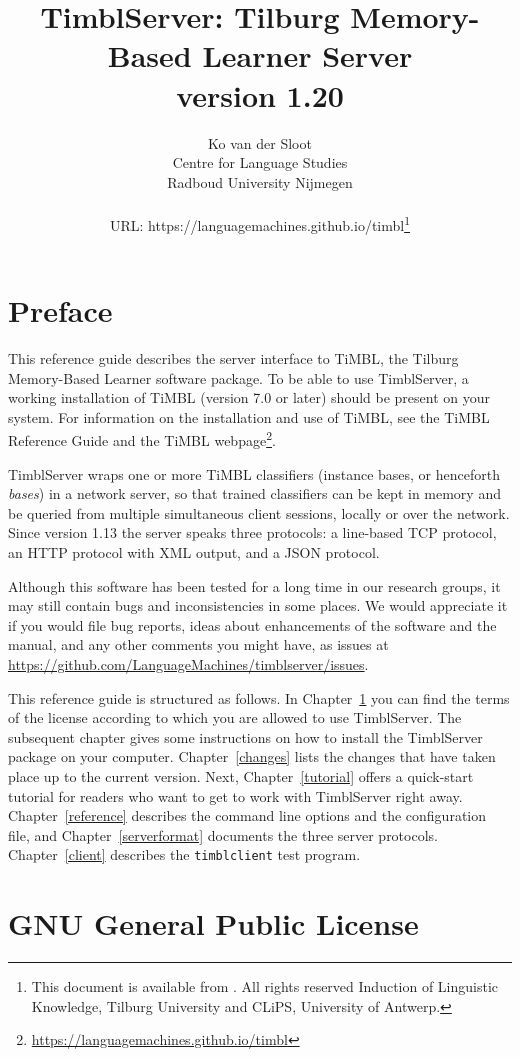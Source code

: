\documentclass{report}
\author{Ko van der Sloot \\
	Centre for Language Studies \\
        Radboud University Nijmegen \\ \\
       URL: https://languagemachines.github.io/timbl\thanks{This document is available from
	\servermanualurl. All rights reserved
	Induction of Linguistic Knowledge, Tilburg University and
        CLiPS, University of Antwerp.}}
\title{{\huge TimblServer: Tilburg Memory-Based Learner Server} \\ \vspace*{0.5cm}
{\bf version 1.20} \\ \vspace*{0.5cm}{\huge Manual}}
\begin{document}

\maketitle

\tableofcontents

\chapter*{Preface}

This reference guide describes the server interface to TiMBL, the
Tilburg Memory-Based Learner software package. To be able to use
TimblServer, a working installation of TiMBL (version 7.0 or later)
should be present on your system. For information on the installation
and use of TiMBL, see the TiMBL Reference Guide \cite{Daelemans+26}
and the TiMBL webpage\footnote{\url{https://languagemachines.github.io/timbl}}.

TimblServer wraps one or more TiMBL classifiers (instance bases, or
henceforth {\em bases}) in a
network server, so that trained classifiers can be kept in memory and
be queried from multiple simultaneous client sessions, locally or over
the network. Since version 1.13 the server speaks three protocols: a
line-based TCP protocol, an HTTP protocol with XML output, and a JSON
protocol.

Although this software has been tested for a long time in our research
groups, it may still contain bugs and inconsistencies in some
places. We would appreciate it if you would file bug reports, ideas
about enhancements of the software and the manual, and any other
comments you might have, as issues at
\url{https://github.com/LanguageMachines/timblserver/issues}.

This reference guide is structured as follows. In
Chapter~\ref{license} you can find the terms of the license according
to which you are allowed to use TimblServer. The subsequent chapter
gives some instructions on how to install the TimblServer package on
your computer. Chapter~\ref{changes} lists the changes that have taken
place up to the current version. Next, Chapter~\ref{tutorial} offers a
quick-start tutorial for readers who want to get to work with
TimblServer right away. Chapter~\ref{reference} describes the command
line options and the configuration file, and
Chapter~\ref{serverformat} documents the three server protocols.
Chapter~\ref{client} describes the {\tt timblclient} test program.

\chapter{GNU General Public License}
\label{license}
\end{document}
